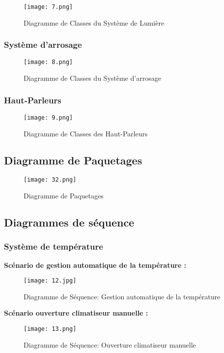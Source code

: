 \begin{spacing}{1.2}
\begin{figure}[H]\centering
\texttt{[image: 7.png]}
\caption{Diagramme de Classes du Système de Lumière}
\label{fig:fig3}
\end{figure}
 
\subsubsection{Système d’arrosage}
\begin{figure}[H]\centering
\texttt{[image: 8.png]}
\caption{Diagramme de Classes du Système d’arrosage}
\label{fig:fig3}
\end{figure}

\subsubsection{Haut-Parleurs}
\begin{figure}[H]\centering
\texttt{[image: 9.png]}
\caption{Diagramme de Classes des Haut-Parleurs}
\label{fig:fig3}
\end{figure}

\subsection{Diagramme de Paquetages}

\begin{figure}[H]\centering
\texttt{[image: 32.png]}
\caption{Diagramme de Paquetages}
\label{fig:fig3}
\end{figure}

\newpage

\subsection{Diagrammes de séquence}

\subsubsection{Système de température }

\textbf{Scénario de gestion automatique de la température : }
\begin{figure}[H]\centering
\texttt{[image: 12.jpg]}
\caption{Diagramme de Séquence: Gestion automatique de la température}
\label{fig:fig3}
\end{figure}

\bigskip

\textbf{Scénario ouverture climatiseur manuelle : }
\begin{figure}[H]\centering
\texttt{[image: 13.png]}
\caption{Diagramme de Séquence: Ouverture climatiseur manuelle}
\label{fig:fig3}
\end{figure}


\end{spacing}
